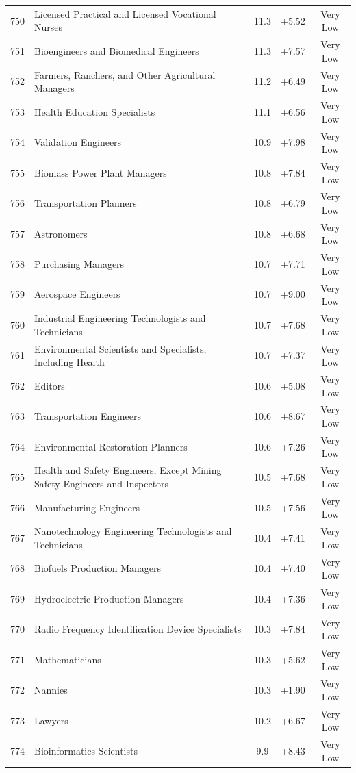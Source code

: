 {\begin{longtable}{rp{7cm}ccc}
750 & Licensed Practical and Licensed Vocational Nurses & 11.3 & +5.52 & Very Low \\
751 & Bioengineers and Biomedical Engineers & 11.3 & +7.57 & Very Low \\
752 & Farmers, Ranchers, and Other Agricultural Managers & 11.2 & +6.49 & Very Low \\
753 & Health Education Specialists & 11.1 & +6.56 & Very Low \\
754 & Validation Engineers & 10.9 & +7.98 & Very Low \\
755 & Biomass Power Plant Managers & 10.8 & +7.84 & Very Low \\
756 & Transportation Planners & 10.8 & +6.79 & Very Low \\
757 & Astronomers & 10.8 & +6.68 & Very Low \\
758 & Purchasing Managers & 10.7 & +7.71 & Very Low \\
759 & Aerospace Engineers & 10.7 & +9.00 & Very Low \\
760 & Industrial Engineering Technologists and Technicians & 10.7 & +7.68 & Very Low \\
761 & Environmental Scientists and Specialists, Including Health & 10.7 & +7.37 & Very Low \\
762 & Editors & 10.6 & +5.08 & Very Low \\
763 & Transportation Engineers & 10.6 & +8.67 & Very Low \\
764 & Environmental Restoration Planners & 10.6 & +7.26 & Very Low \\
765 & Health and Safety Engineers, Except Mining Safety Engineers and Inspectors & 10.5 & +7.68 & Very Low \\
766 & Manufacturing Engineers & 10.5 & +7.56 & Very Low \\
767 & Nanotechnology Engineering Technologists and Technicians & 10.4 & +7.41 & Very Low \\
768 & Biofuels Production Managers & 10.4 & +7.40 & Very Low \\
769 & Hydroelectric Production Managers & 10.4 & +7.36 & Very Low \\
770 & Radio Frequency Identification Device Specialists & 10.3 & +7.84 & Very Low \\
771 & Mathematicians & 10.3 & +5.62 & Very Low \\
772 & Nannies & 10.3 & +1.90 & Very Low \\
773 & Lawyers & 10.2 & +6.67 & Very Low \\
774 & Bioinformatics Scientists & 9.9 & +8.43 & Very Low \\

\end{longtable}}
